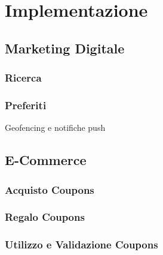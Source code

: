 \section{Implementazione}

\subsection{Marketing Digitale}

\subsubsection{Ricerca}

\subsubsection{Preferiti}

Geofencing e notifiche push

\subsection{E-Commerce}

\subsubsection{Acquisto Coupons}

\subsubsection{Regalo Coupons}

\subsubsection{Utilizzo e Validazione Coupons}

\newpage